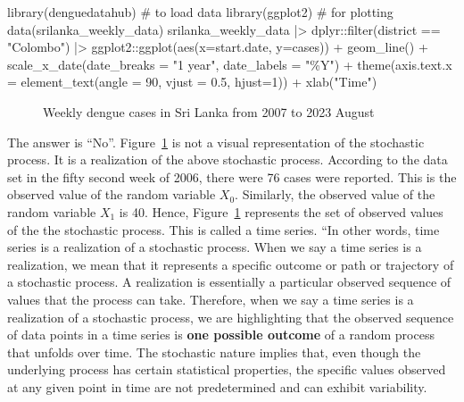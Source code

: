 \documentclass[
  letterpaper,
  DIV=11,
  numbers=noendperiod]{scrreprt}
\newenvironment{Shaded}{\begin{snugshade}}{\end{snugshade}}
\newcommand{\AttributeTok}[1]{\textcolor[rgb]{0.40,0.45,0.13}{#1}}
\newcommand{\CommentTok}[1]{\textcolor[rgb]{0.37,0.37,0.37}{#1}}
\newcommand{\DecValTok}[1]{\textcolor[rgb]{0.68,0.00,0.00}{#1}}
\newcommand{\FloatTok}[1]{\textcolor[rgb]{0.68,0.00,0.00}{#1}}
\newcommand{\FunctionTok}[1]{\textcolor[rgb]{0.28,0.35,0.67}{#1}}
\newcommand{\NormalTok}[1]{\textcolor[rgb]{0.00,0.23,0.31}{#1}}
\newcommand{\SpecialCharTok}[1]{\textcolor[rgb]{0.37,0.37,0.37}{#1}}
\newcommand{\StringTok}[1]{\textcolor[rgb]{0.13,0.47,0.30}{#1}}
\begin{document}
\begin{Shaded}
\begin{Highlighting}[]
\FunctionTok{library}\NormalTok{(denguedatahub) }\CommentTok{\# to load data}
\FunctionTok{library}\NormalTok{(ggplot2) }\CommentTok{\# for plotting}
\FunctionTok{data}\NormalTok{(srilanka\_weekly\_data)}
\NormalTok{srilanka\_weekly\_data }\SpecialCharTok{|\textgreater{}} 
\NormalTok{  dplyr}\SpecialCharTok{::}\FunctionTok{filter}\NormalTok{(district }\SpecialCharTok{==} \StringTok{"Colombo"}\NormalTok{) }\SpecialCharTok{|\textgreater{}}
\NormalTok{ggplot2}\SpecialCharTok{::}\FunctionTok{ggplot}\NormalTok{(}\FunctionTok{aes}\NormalTok{(}\AttributeTok{x=}\NormalTok{start.date, }\AttributeTok{y=}\NormalTok{cases)) }\SpecialCharTok{+} 
  \FunctionTok{geom\_line}\NormalTok{()  }\SpecialCharTok{+} 
  \FunctionTok{scale\_x\_date}\NormalTok{(}\AttributeTok{date\_breaks =} \StringTok{"1 year"}\NormalTok{, }\AttributeTok{date\_labels =} \StringTok{"\%Y"}\NormalTok{) }\SpecialCharTok{+} 
  \FunctionTok{theme}\NormalTok{(}\AttributeTok{axis.text.x =} \FunctionTok{element\_text}\NormalTok{(}\AttributeTok{angle =} \DecValTok{90}\NormalTok{, }\AttributeTok{vjust =} \FloatTok{0.5}\NormalTok{, }\AttributeTok{hjust=}\DecValTok{1}\NormalTok{)) }\SpecialCharTok{+} \FunctionTok{xlab}\NormalTok{(}\StringTok{"Time"}\NormalTok{)}
\end{Highlighting}
\end{Shaded}

\begin{figure}[H]


\caption{\label{fig-plot1}Weekly dengue cases in Sri Lanka from 2007 to
2023 August}

\end{figure}%

The answer is ``No''. Figure~\ref{fig-plot1} is not a visual
representation of the stochastic process. It is a realization of the
above stochastic process. According to the data set in the fifty second
week of 2006, there were 76 cases were reported. This is the observed
value of the random variable \(X_0\). Similarly, the observed value of
the random variable \(X_1\) is 40. Hence, Figure~\ref{fig-plot1}
represents the set of observed values of the the stochastic process.
This is called a time series. ``In other words, time series is a
realization of a stochastic process. When we say a time series is a
realization, we mean that it represents a specific outcome or path or
trajectory of a stochastic process. A realization is essentially a
particular observed sequence of values that the process can take.
Therefore, when we say a time series is a realization of a stochastic
process, we are highlighting that the observed sequence of data points
in a time series is \textbf{one possible outcome} of a random process
that unfolds over time. The stochastic nature implies that, even though
the underlying process has certain statistical properties, the specific
values observed at any given point in time are not predetermined and can
exhibit variability.
\end{document}
